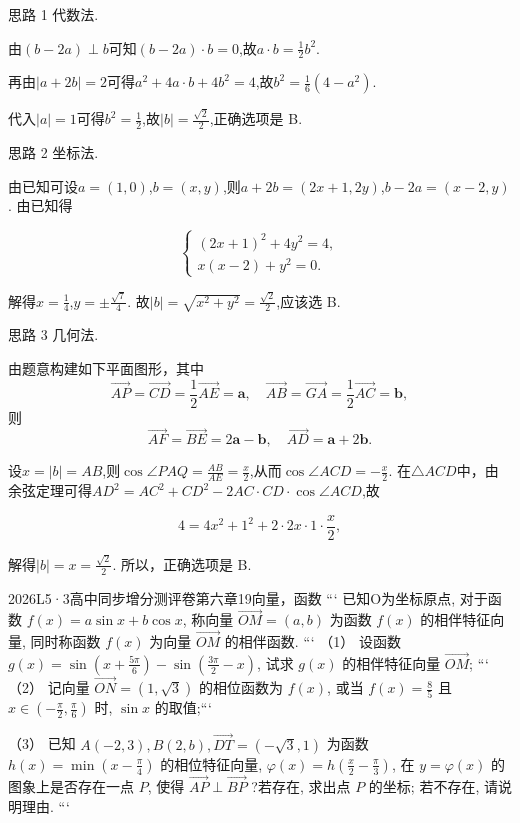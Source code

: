 \documentclass[12pt,UTF-8,a4paper]{ctexart}
\numberwithin{figure}{section}
\theoremstyle{mystyle}
\theoremstyle{mystylekaishu}
\theoremstyle{mystyle}
\numberwithin{xiti}{section}
\begin{document}
\begin{solutions}
思路 1 代数法.

由$(b-2a) \perp b$可知$(b-2a) \cdot b=0$,故$a \cdot b=\frac{1}{2}b^2$.

再由$|a+2b|=2$可得$a^2+4a \cdot b+4b^2=4$,故$b^2=\frac{1}{6}(4-a^2)$.

代入$|a|=1$可得$b^2=\frac{1}{2}$,故$|b|=\frac{\sqrt{2}}{2}$,正确选项是 B.

思路 2 坐标法.

由已知可设$a=(1,0)$,$b=(x,y)$,则$a+2b=(2x+1,2y)$,$b-2a=(x-2,y)$. 由已知得

$$
\begin{cases} (2x+1)^2+4y^2=4, \\ x(x-2)+y^2=0. \end{cases}
$$

解得$x=\frac{1}{4}$,$y=\pm\frac{\sqrt{7}}{4}$. 故$|b|=\sqrt{x^2+y^2}=\frac{\sqrt{2}}{2}$,应该选 B.

思路 3 几何法.

由题意构建如下平面图形，其中
\[
\overrightarrow{AP}=\overrightarrow{CD}=\frac{1}{2}\overrightarrow{AE}=\boldsymbol{a},\quad
\overrightarrow{AB}=\overrightarrow{GA}=\frac{1}{2}\overrightarrow{AC}=\boldsymbol{b},
\]
则
\[
\overrightarrow{AF}=\overrightarrow{BE}=2\boldsymbol{a}-\boldsymbol{b},\quad
\overrightarrow{AD}=\boldsymbol{a}+2\boldsymbol{b}.
\]

设$x=|b|=AB$,则$\cos \angle PAQ=\frac{AB}{AE}=\frac{x}{2}$,从而$\cos \angle ACD=-\frac{x}{2}$. 在$\triangle ACD$中，由余弦定理可得$AD^2=AC^2+CD^2-2AC \cdot CD \cdot \cos \angle ACD$,故

$$
4=4x^2+1^2+2 \cdot 2x \cdot 1 \cdot \frac{x}{2},
$$

解得$|b|=x=\frac{\sqrt{2}}{2}$. 所以，正确选项是 B.
\end{solutions}


\begin{problem}{2026}{L}{5·3高中同步增分测评卷第六章}{19}{向量，函数}
```
已知O为坐标原点, 对于函数 $f(x)=a \sin x+b \cos x$, 称向量 $\overrightarrow{O M}=(a, b)$ 为函数 $f(x)$ 的相伴特征向量, 同时称函数 $f(x)$ 为向量 $\overrightarrow{O M}$ 的相伴函数.
```
（1） 设函数 $g(x)=\sin \left(x+\frac{5 \pi}{6}\right)-\sin \left(\frac{3 \pi}{2}-x\right)$, 试求 $g(x)$ 的相伴特征向量 $\overrightarrow{O M}$;
```
（2） 记向量 $\overrightarrow{O N}=(1, \sqrt{3})$ 的相位函数为 $f(x)$, 或当 $f(x)=\frac{8}{5}$ 且 $x \in\left(-\frac{\pi}{2}, \frac{\pi}{6}\right)$ 时, $\sin x$ 的取值;```

（3） 已知 $A(-2,3), B(2, b), \overrightarrow{D T}=(-\sqrt{3}, 1)$ 为函数 $h(x)=\min \left(x-\frac{\pi}{4}\right)$ 的相位特征向量, $\varphi(x)=h\left(\frac{x}{2}-\frac{\pi}{3}\right)$, 在 $y=\varphi(x)$ 的图象上是否存在一点 $P$, 使得 $\overrightarrow{A P} \perp \overrightarrow{B P}$ ?若存在, 求出点 $P$ 的坐标; 若不存在, 请说明理由.
```
\end{problem}
\end{document}

